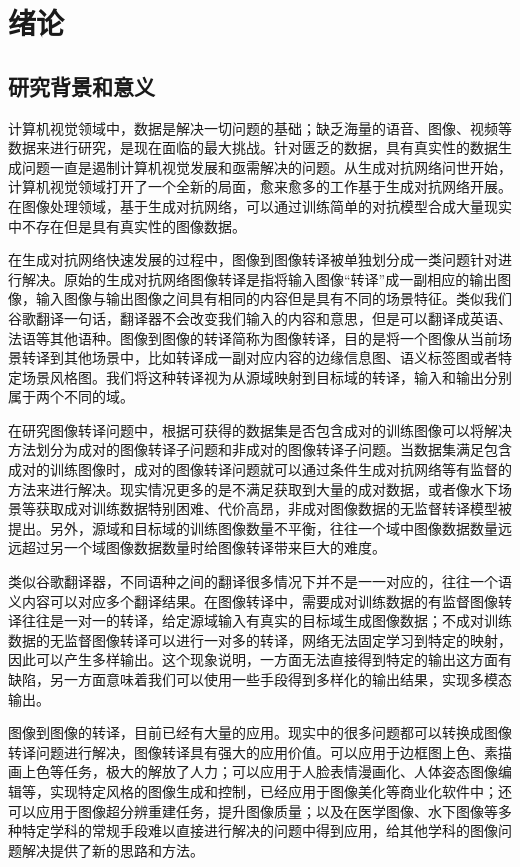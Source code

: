 \chapter{绪论}
\section{研究背景和意义}
计算机视觉领域中，数据是解决一切问题的基础；缺乏海量的语音、图像、视频等数据来进行研究，是现在面临的最大挑战。针对匮乏的数据，具有真实性的数据生成问题一直是遏制计算机视觉发展和亟需解决的问题。从生成对抗网络问世开始，计算机视觉领域打开了一个全新的局面，愈来愈多的工作基于生成对抗网络开展。在图像处理领域，基于生成对抗网络，可以通过训练简单的对抗模型合成大量现实中不存在但是具有真实性的图像数据。

在生成对抗网络快速发展的过程中，图像到图像转译被单独划分成一类问题针对进行解决。原始的生成对抗网络图像转译是指将输入图像“转译”成一副相应的输出图像，输入图像与输出图像之间具有相同的内容但是具有不同的场景特征。类似我们谷歌翻译一句话，翻译器不会改变我们输入的内容和意思，但是可以翻译成英语、法语等其他语种。图像到图像的转译简称为图像转译，目的是将一个图像从当前场景转译到其他场景中，比如转译成一副对应内容的边缘信息图、语义标签图或者特定场景风格图。我们将这种转译视为从源域映射到目标域的转译，输入和输出分别属于两个不同的域。

在研究图像转译问题中，根据可获得的数据集是否包含成对的训练图像可以将解决方法划分为成对的图像转译子问题和非成对的图像转译子问题。当数据集满足包含成对的训练图像时，成对的图像转译问题就可以通过条件生成对抗网络等有监督的方法来进行解决。现实情况更多的是不满足获取到大量的成对数据，或者像水下场景等获取成对训练数据特别困难、代价高昂，非成对图像数据的无监督转译模型被提出。另外，源域和目标域的训练图像数量不平衡，往往一个域中图像数据数量远远超过另一个域图像数据数量时给图像转译带来巨大的难度。

类似谷歌翻译器，不同语种之间的翻译很多情况下并不是一一对应的，往往一个语义内容可以对应多个翻译结果。在图像转译中，需要成对训练数据的有监督图像转译往往是一对一的转译，给定源域输入有真实的目标域生成图像数据；不成对训练数据的无监督图像转译可以进行一对多的转译，网络无法固定学习到特定的映射，因此可以产生多样输出。这个现象说明，一方面无法直接得到特定的输出这方面有缺陷，另一方面意味着我们可以使用一些手段得到多样化的输出结果，实现多模态输出。

图像到图像的转译，目前已经有大量的应用。现实中的很多问题都可以转换成图像转译问题进行解决，图像转译具有强大的应用价值。可以应用于边框图上色、素描画上色等任务，极大的解放了人力；可以应用于人脸表情漫画化、人体姿态图像编辑等，实现特定风格的图像生成和控制，已经应用于图像美化等商业化软件中；还可以应用于图像超分辨重建任务，提升图像质量；以及在医学图像、水下图像等多种特定学科的常规手段难以直接进行解决的问题中得到应用，给其他学科的图像问题解决提供了新的思路和方法。

